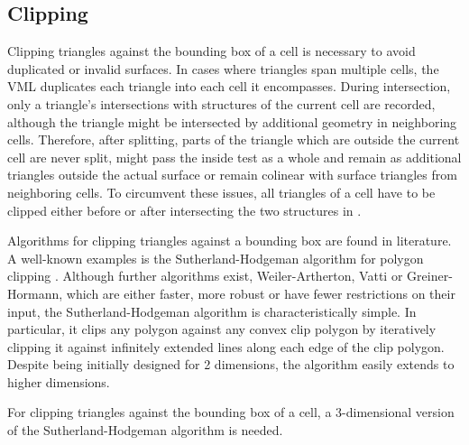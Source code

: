\subsection{Clipping}
\label{sec:clipping}

Clipping triangles against the bounding box of a cell is necessary to avoid duplicated or invalid surfaces.
In cases where triangles span multiple cells, the VML duplicates each triangle into each cell it encompasses.
During intersection, only a triangle's intersections with structures of the current cell are recorded, although the triangle might be intersected by additional geometry in neighboring cells.
Therefore, after splitting, parts of the triangle which are outside the current cell are never split, might pass the inside test as a whole and remain as additional triangles outside the actual surface or remain colinear with surface triangles from neighboring cells.
To circumvent these issues, all triangles of a cell have to be clipped either before or after intersecting the two structures in .

Algorithms for clipping triangles against a bounding box are found in literature.
A well-known examples is the Sutherland-Hodgeman algorithm for polygon clipping \cite{polygon_clipping}.
Although further algorithms exist, \eg Weiler-Artherton, Vatti or Greiner-Hormann, which are either faster, more robust or have fewer restrictions on their input, the Sutherland-Hodgeman algorithm is characteristically simple.
In particular, it clips any polygon against any convex clip polygon by iteratively clipping it against infinitely extended lines along each edge of the clip polygon.
Despite being initially designed for 2 dimensions, the algorithm easily extends to higher dimensions.

For clipping triangles against the bounding box of a cell, a 3-dimensional version of the Sutherland-Hodgeman algorithm is needed.

